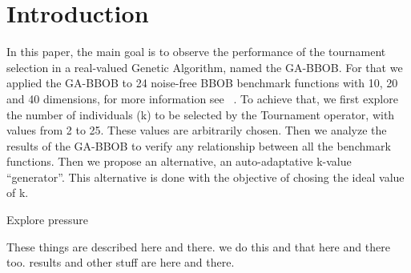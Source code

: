 \section{Introduction}\label{intro}


 In this paper, the main goal is to observe the performance of the tournament selection in a real-valued Genetic Algorithm, named the GA-BBOB. For that we applied the GA-BBOB to 24 noise-free BBOB benchmark functions with 10, 20 and 40 dimensions, for more information see ~\cite{hansen2010real}. To achieve that, we first explore the number of individuals (k) to be selected by the Tournament operator, with values from 2 to 25. These values are arbitrarily chosen. Then we analyze the results of the GA-BBOB to verify any relationship between all the benchmark functions. Then we propose an alternative, an auto-adaptative k-value ``generator''. This alternative is done with the objective of chosing the ideal value of k.

Explore pressure

These things are described here and there. we do this and that here and there too. results and other stuff are here and there.